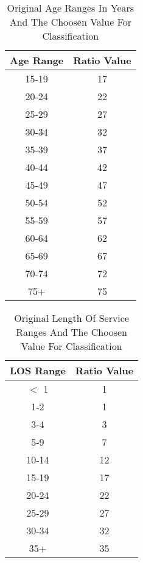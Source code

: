 \documentclass{article}
\begin{document}
    \begin{center}
        \begin{table}
            \centering
            \begin{tabular}{ |c|c| }
                \hline
                Age Range & Ratio Value \\
                \hline
                15-19 & 17 \\
                20-24 & 22 \\
                25-29 & 27 \\
                30-34 & 32 \\
                35-39 & 37 \\
                40-44 & 42 \\
                45-49 & 47 \\
                50-54 & 52 \\
                55-59 & 57 \\
                60-64 & 62 \\
                65-69 & 67 \\
                70-74 & 72 \\
                75+ & 75 \\
                \hline
            \end{tabular}
            \caption{Original Age Ranges In Years And The Choosen Value For Classification}
            \label{tab:3}
        \end{table}
    \end{center}

    \begin{center}
        \begin{table}
            \centering
            \begin{tabular}{ |c|c| }
                \hline
                LOS Range & Ratio Value \\
                \hline
                $<$ 1 & 1 \\
                1-2 & 1 \\
                3-4 & 3 \\
                5-9 & 7 \\
                10-14 & 12 \\
                15-19 & 17 \\
                20-24 & 22 \\
                25-29 & 27 \\
                30-34 & 32 \\
                35+ & 35 \\
                \hline
            \end{tabular}
            \caption{Original Length Of Service Ranges And The Choosen Value For Classification}
            \label{tab:4}
        \end{table}
    \end{center}
\end{document}
